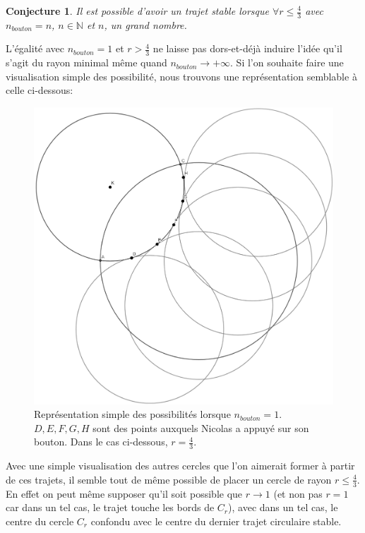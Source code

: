 \documentclass{amsart}
\newtheorem{conjecture}[theorem]{Conjecture}
\theoremstyle{definition}
\theoremstyle{remark}
\numberwithin{equation}{section}
\begin{document}
\begin{conjecture}
  Il est possible d'avoir un trajet stable lorsque $\forall r\leq\frac{4}{3}$ avec $n_{bouton}=n$, $n\in\mathbb{N}$ et $n$, un grand nombre.
\end{conjecture}

L'égalité avec $n_{bouton}=1$ et $r>\frac{4}{3}$ ne laisse pas dors-et-déjà induire l'idée qu'il s'agit du rayon minimal même quand $n_{bouton}\to +\infty$. Si l'on souhaite faire une visualisation simple des possibilité, nous trouvons une représentation semblable à celle ci-dessous:

\begin{figure}[H]
  \centering
  \includegraphics[scale=0.2]{images/conjecture.png}
  \caption{Représentation simple des possibilités lorsque $n_{bouton}=1$. $D,E,F,G,H$ sont des points auxquels Nicolas a appuyé sur son bouton. Dans le cas ci-dessous, $r=\frac{4}{3}$.}
\end{figure}

Avec une simple visualisation des autres cercles que l'on aimerait former à partir de ces trajets, il semble tout de même possible de placer un cercle de rayon $r\leq\frac{4}{3}$. En effet on peut même supposer qu'il soit possible que $r\to1$ (et non pas $r=1$ car dans un tel cas, le trajet touche les bords de $C_r$), avec dans un tel cas,
le centre du cercle $C_r$ confondu avec le centre du dernier trajet circulaire stable.
\end{document}
